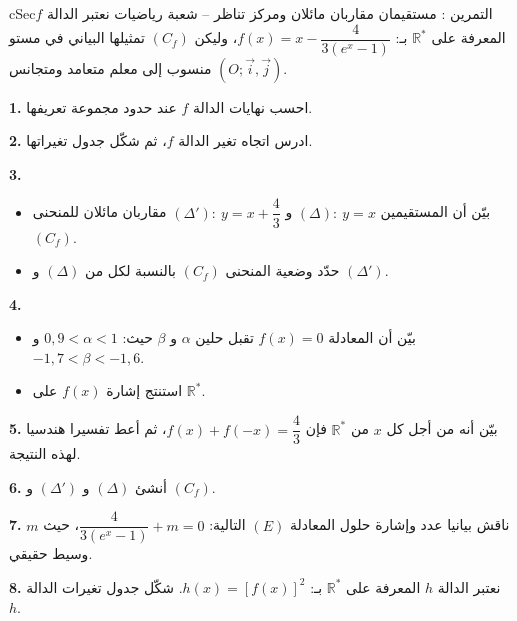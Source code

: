 \documentclass[12pt,a4paper]{article}
\newenvironment{BOX}[2]{\begin{otherlanguage}{english}\begin{arbox}{#1}{#2}}{\end{arbox}\end{otherlanguage}}
\newcounter{exo}
\newenvironment{tamrin}[1]{\stepcounter{exo}\begin{BOX}{cSec}{التمرين \theexo: #1}}{\end{BOX}}
\newcommand{\R}{\mathbb{R}}
\newenvironment{sq}{\begin{itemize}[leftmargin=2.4em,itemsep=3pt]}{\end{itemize}}
\newcommand{\qa}{\item[(أ)]}\newcommand{\qb}{\item[(ب)]}\newcommand{\qc}{\item[(جـ)]}\newcommand{\qd}{\item[(د)]}\newcommand{\qe}{\item[(هـ)]}
\newcommand{\QQ}[1]{\par\smallskip\textbf{#1.} }
\begin{document}
\begin{tamrin}{مستقيمان مقاربان مائلان ومركز تناظر -- شعبة رياضيات}
نعتبر الدالة $f$ المعرفة على $\R^{*}$ بـ: $f(x)=x-\dfrac{4}{3\left(e^{x}-1\right)}$، وليكن $(C_f)$ تمثيلها البياني في مستو منسوب إلى معلم متعامد ومتجانس $\left(O;\vec i,\vec j\right)$.
\QQ{1} احسب نهايات الدالة $f$ عند حدود مجموعة تعريفها.
\QQ{2} ادرس اتجاه تغير الدالة $f$، ثم شكّل جدول تغيراتها.
\QQ{3} \begin{sq}
\qa بيّن أن المستقيمين $(\Delta):\ y=x$ و $(\Delta'):\ y=x+\dfrac43$ مقاربان مائلان للمنحنى $(C_f)$.
\qb حدّد وضعية المنحنى $(C_f)$ بالنسبة لكل من $(\Delta)$ و $(\Delta')$.
\end{sq}
\QQ{4} \begin{sq}
\qa بيّن أن المعادلة $f(x)=0$ تقبل حلين $\alpha$ و $\beta$ حيث: $0{,}9<\alpha<1$ و $-1{,}7<\beta<-1{,}6$.
\qb استنتج إشارة $f(x)$ على $\R^{*}$.
\end{sq}
\QQ{5} بيّن أنه من أجل كل $x$ من $\R^{*}$ فإن $f(x)+f(-x)=\dfrac43$، ثم أعط تفسيرا هندسيا لهذه النتيجة.
\QQ{6} أنشئ $(\Delta)$ و $(\Delta')$ و $(C_f)$.
\QQ{7} ناقش بيانيا عدد وإشارة حلول المعادلة $(E)$ التالية: $\dfrac{4}{3\left(e^{x}-1\right)}+m=0$، حيث $m$ وسيط حقيقي.
\QQ{8} نعتبر الدالة $h$ المعرفة على $\R^{*}$ بـ: $h(x)=\left[f(x)\right]^{2}$. شكّل جدول تغيرات الدالة $h$.
\end{tamrin}
\end{document}
